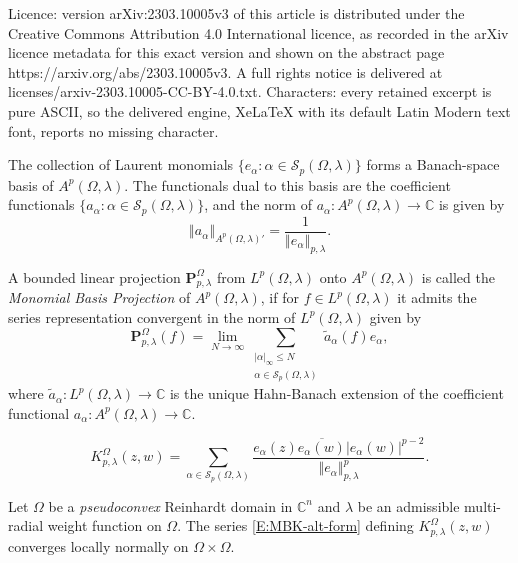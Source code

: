 \documentclass[10pt,a4paper]{amsart}
\newcommand{\C}{{\mathbb C}}
\newcommand{\abs}[1]{\left\vert#1\right\vert}
\newcommand{\cs}{{\mathcal S}}
\newcommand{\norm}[1]{\left\Vert#1\right\Vert}
\newcommand{\ol}{\overline}
\newcommand{\wt}{\widetilde}
\begin{document}
Licence: version arXiv:2303.10005v3 of this article is distributed under the Creative Commons Attribution 4.0 International licence, as recorded in the arXiv licence metadata for this exact version and shown on the abstract page https://arxiv.org/abs/2303.10005v3. A full rights notice is delivered at licenses/arxiv-2303.10005-CC-BY-4.0.txt. Characters: every retained excerpt is pure ASCII, so the delivered engine, XeLaTeX with its default Latin Modern text font, reports no missing character.
\begin{theorem}\label{T:monomials-form-a-Schauder-basis}
The collection of Laurent monomials $\{e_\alpha: \alpha \in \cs_p(\Omega,\lambda) \}$ forms a Banach-space basis of $A^p(\Omega,\lambda)$. 
The functionals dual to this basis are the coefficient functionals $\{a_\alpha: \alpha \in \cs_p(\Omega,\lambda) \}$, and the norm of $a_\alpha:A^p(\Omega, \lambda) \to \C$ is given by
\begin{equation}\label{eq-aalphanorm} 
\norm{{a_\alpha}}_{A^p(\Omega, \lambda)'} = \frac{1}{\norm{e_\alpha}_{p,\lambda}}.
\end{equation}
\end{theorem}

\begin{definition}\label{D:def-of-MBP-1}
A bounded linear projection $\bm{P}_{p,\lambda}^\Omega$ from $L^p(\Omega,\lambda)$ onto $A^p(\Omega,\lambda)$ is called the \emph{Monomial Basis Projection} of $A^p(\Omega,\lambda)$, if for $f \in L^p(\Omega,\lambda)$ it admits the series representation convergent in the norm of $L^p(\Omega,\lambda)$ given by
\begin{equation}\label{E:def-of-MBP-2}
\bm{P}^\Omega_{p,\lambda}(f) = \lim_{N\to \infty} \sum_{\substack{\abs{\alpha}_\infty\leq N \\ \alpha\in \cs_p(\Omega,\lambda) }}\wt{a}_\alpha(f) e_\alpha,
\end{equation}
where $\wt{a}_\alpha:L^p(\Omega,\lambda) \to \C$ is the unique Hahn-Banach extension of the coefficient functional $a_\alpha:A^p(\Omega,\lambda) \to \C$.
\end{definition}

\begin{equation}\label{E:MBK-alt-form}
    K_{p,\lambda}^\Omega(z,w) =\sum_{\alpha\in \mathcal{S}_p(\Omega, \lambda) }\frac{e_\alpha(z) \ol{e_\alpha(w)}\abs{e_\alpha(w)}^{p-2}} {\norm{e_\alpha}_{p,\lambda}^p}.
\end{equation}

\begin{theorem}\label{thm-MBK1}
Let $\Omega$ be a \emph{pseudoconvex}  Reinhardt domain in $\C^n$ and $\lambda$ be an admissible  multi-radial weight function on $\Omega$. The series \eqref{E:MBK-alt-form} defining $K^\Omega_{p,\lambda}(z,w)$ converges locally normally on  $\Omega \times \Omega$.  
\end{theorem}
\end{document}
